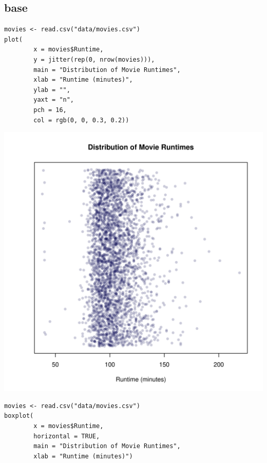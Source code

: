 \documentclass[a4paper, captions=tableheading]{tufte-book}
\begin{document}
\subsection{base}
\label{sec:orgheadline7}

\begin{verbatim}
movies <- read.csv("data/movies.csv")
plot(
		x = movies$Runtime,
		y = jitter(rep(0, nrow(movies))),
		main = "Distribution of Movie Runtimes",
		xlab = "Runtime (minutes)",
		ylab = "",
		yaxt = "n",
		pch = 16,
		col = rgb(0, 0, 0.3, 0.2))
\end{verbatim}

\includegraphics[width=.9\linewidth]{img/1-num-base-01.pdf}

\begin{verbatim}
movies <- read.csv("data/movies.csv")
boxplot(
		x = movies$Runtime,
		horizontal = TRUE,
		main = "Distribution of Movie Runtimes",
		xlab = "Runtime (minutes)")
\end{verbatim}
\end{document}
